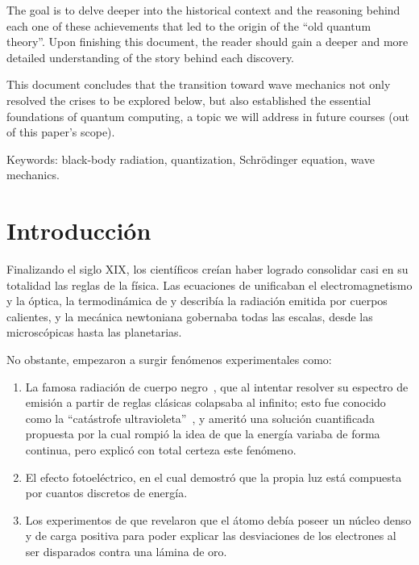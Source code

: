 \documentclass[11pt,a4paper,spanish]{book}
\begin{document}
The goal is to delve deeper into the historical context and the
reasoning behind each one of these achievements that led to the
origin of the ``old quantum theory''. Upon finishing this document,
the reader should gain a deeper and more detailed understanding of
the story behind each discovery.

This document concludes that the transition toward wave mechanics not
only resolved the crises to be explored below, but also established
the essential foundations of quantum computing, a topic we will
address in future courses (out of this paper's scope).

Keywords: black-body radiation, quantization, Schrödinger
equation, wave mechanics.

\mainmatter
\chapter{Introducción}

Finalizando el siglo XIX, los científicos creían haber logrado
consolidar casi en su totalidad las reglas de la física. Las
ecuaciones de \cite{maxwell1865} unificaban el electromagnetismo y la
óptica, la termodinámica de \cite{stefan1879} y \cite{wien1893}
describía la radiación emitida por cuerpos calientes, y la mecánica
newtoniana gobernaba todas las escalas, desde las microscópicas hasta
las planetarias.

No obstante, empezaron a surgir fenómenos experimentales como:

\begin{enumerate}
  \item La famosa radiación de cuerpo negro~\citep{planck1900}, que
    al intentar resolver su espectro de emisión a partir de reglas
    clásicas colapsaba al infinito; esto fue conocido como la
    ``catástrofe ultravioleta''~\citep{rayleigh1900,jeans1905}, y
    ameritó una solución cuantificada propuesta por \cite{planck1901}
    la cual rompió la idea de que la energía variaba de forma
    continua, pero explicó con total certeza este fenómeno.
  \item El efecto fotoeléctrico, en el cual
    \cite{einsteina1905_photoelectric} demostró que la propia luz
    está compuesta por cuantos discretos de energía.
  \item Los experimentos de \cite{rutherford1911} que revelaron que
    el átomo debía poseer un núcleo denso y de carga positiva para
    poder explicar las desviaciones de los electrones al ser
    disparados contra una lámina de oro.
\end{enumerate}
\end{document}
